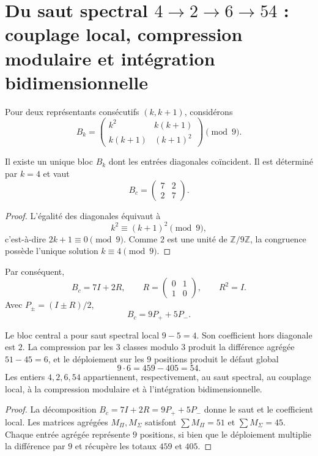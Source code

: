 \section{Du saut spectral \texorpdfstring{\(4\to2\to6\to54\)}{4 à 2 à 6 à 54} : couplage local, compression modulaire et intégration bidimensionnelle}
\label{sec:sucesor83-salto-espectral-4-2-6-54}

Pour deux représentants consécutifs \((k,k+1)\), considérons
\[
B_k=
\begin{pmatrix}
k^2&k(k+1)\\
k(k+1)&(k+1)^2
\end{pmatrix}\pmod 9.
\]

\begin{theorem}
\label{thm:sucesor83-app-bloque-central}
Il existe un unique bloc \(B_k\) dont les entrées diagonales coïncident. Il est
déterminé par \(k=4\) et vaut
\[
B_c=\begin{pmatrix}7&2\\2&7\end{pmatrix}.
\]
\end{theorem}

\begin{proof}
L'égalité des diagonales équivaut à
\[
k^2\equiv(k+1)^2\pmod 9,
\]
c'est-à-dire \(2k+1\equiv0\pmod 9\). Comme \(2\) est une unité de
\(\mathbb Z/9\mathbb Z\), la congruence possède l'unique solution
\(k\equiv4\pmod 9\).
\end{proof}

Par conséquent,
\[
B_c=7I+2R,
\qquad
R=\begin{pmatrix}0&1\\1&0\end{pmatrix},
\qquad R^2=I.
\]
Avec \(P_\pm=(I\pm R)/2\),
\[
B_c=9P_++5P_-.
\]

\begin{theorem}
\label{thm:sucesor83-app-jerarquia-4-2-6-54}
Le bloc central a pour saut spectral local \(9-5=4\). Son coefficient
hors diagonale est \(2\). La compression par les \(3\) classes modulo
\(3\) produit la différence agrégée \(51-45=6\), et le déploiement sur les
\(9\) positions produit le défaut global
\[
9\cdot6=459-405=54.
\]
Les entiers \(4,2,6,54\) appartiennent, respectivement, au saut spectral,
au couplage local, à la compression modulaire et à l'intégration
bidimensionnelle.
\end{theorem}

\begin{proof}
La décomposition \(B_c=7I+2R=9P_++5P_-\) donne le saut et le coefficient
local. Les matrices agrégées \(M_\Pi,M_\Sigma\) satisfont
\(\sum M_\Pi=51\) et \(\sum M_\Sigma=45\). Chaque entrée agrégée représente
\(9\) positions, si bien que le déploiement multiplie la différence par
\(9\) et récupère les totaux \(459\) et \(405\).
\end{proof}

